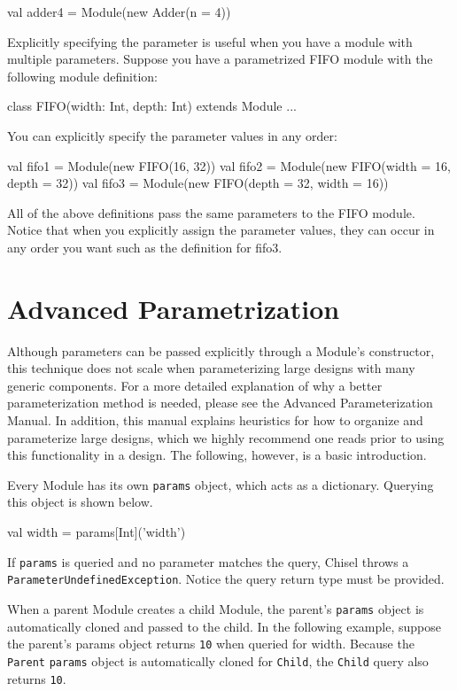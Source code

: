 \begin{scala}
val adder4 = Module(new Adder(n = 4))
\end{scala}

Explicitly specifying the parameter is useful when you have a module with multiple parameters. Suppose you have a parametrized FIFO module with the following module definition:

\begin{scala}
class FIFO(width: Int, depth: Int) extends Module {...}
\end{scala}

You can explicitly specify the parameter values in any order:

\begin{scala}
val fifo1 = Module(new FIFO(16, 32))
val fifo2 = Module(new FIFO(width = 16, depth = 32))
val fifo3 = Module(new FIFO(depth = 32, width = 16))
\end{scala}

All of the above definitions pass the same parameters to the FIFO module. Notice that when you explicitly assign the parameter values, they can occur in any order you want such as the definition for fifo3.

\section{Advanced Parametrization}

Although parameters can be passed explicitly through a Module's constructor, this technique does not scale when parameterizing large designs with many generic components. For a more detailed explanation of why a better parameterization method is needed, please see the Advanced Parameterization Manual. In addition, this manual explains heuristics for how to organize and parameterize large designs, which we highly recommend one reads prior to using this functionality in a design. The following, however, is a basic introduction.

Every Module has its own \verb+params+ object, which acts as a dictionary. Querying this object is shown below.

\begin{scala}
val width = params[Int]('width')
\end{scala}

If \verb+params+ is queried and no parameter matches the query, Chisel throws a \verb+ParameterUndefinedException+. Notice the query return type must be provided.

When a parent Module creates a child Module, the parent's \verb+params+ object is automatically cloned and passed to the child. In the following example, suppose the parent's params object returns \verb+10+ when queried for width. Because the \verb+Parent+ \verb+params+ object is automatically cloned for \verb+Child+, the \verb+Child+ query also returns \verb+10+.

